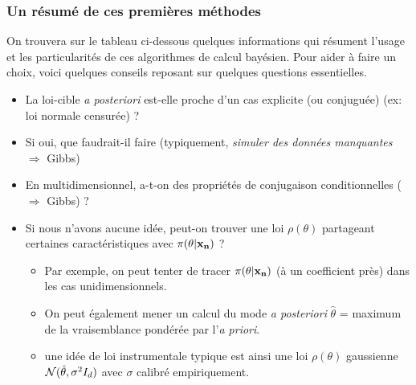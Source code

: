 \subsubsection{Un résumé de ces premières méthodes}

On trouvera sur le tableau ci-dessous quelques informations qui résument l'usage et les particularités de ces algorithmes de calcul bayésien. Pour aider à faire un choix, voici quelques conseils reposant sur quelques questions essentielles.
\begin{itemize}
\item La loi-cible {\it a posteriori} est-elle proche d'un cas explicite (ou conjuguée) (ex: loi normale censurée) ?
\item Si oui, que faudrait-il faire (typiquement, \emph{simuler des données manquantes} $\Rightarrow$ Gibbs)
\item En multidimensionnel, a-t-on des propriétés de conjugaison conditionnelles ($\Rightarrow$ Gibbs) ? 
\item Si nous n'avons aucune idée, peut-on trouver une loi $\rho(\theta)$ partageant certaines caractéristiques avec $\pi(\theta|{\bf x_n})$ ?
\begin{itemize}
\item Par exemple, on peut tenter de tracer  $\pi(\theta|{\bf x_n})$ (à un coefficient près) dans les cas unidimensionnels. 
\item On peut également mener un calcul du  mode {\it a posteriori} $\hat{\theta}$ = maximum de la vraisemblance pondérée par l'{\it a priori}.
\item une idée de loi instrumentale typique est ainsi une loi $\rho(\theta)$  gaussienne ${\cal{N}}(\hat{\theta},\sigma^2I_d)$ avec $\sigma$ calibré empiriquement. 
\end{itemize}
\end{itemize}


